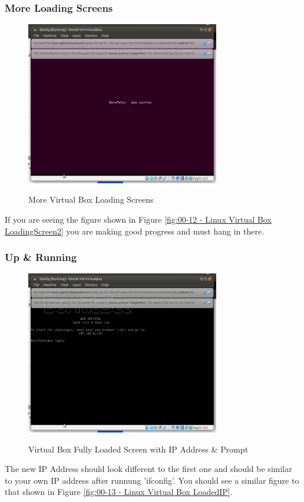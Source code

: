 \subsubsection{More Loading Screens}
\begin{figure}[!htb]
    \centering
    \includegraphics[width=0.752\textwidth]{images/00-12.png}\\[0cm]  
    \caption[Virtual Box]{More Virtual Box Loading Screens}
    \label{fig:00-12 - Linux Virtual Box LoadingScreen2} 
\end{figure}
If you are seeing the figure shown in Figure \vref{fig:00-12 - Linux Virtual Box LoadingScreen2}
you are making good progress and must hang in there.

\subsubsection{Up \& Running}

\begin{figure}[!htb]
    \centering
    \includegraphics[width=0.752\textwidth]{images/00-13.png}\\[0cm]  
    \caption[Virtual Box]{Virtual Box Fully Loaded Screen with IP Address \& Prompt}
    \label{fig:00-13 - Linux Virtual Box LoadedIP} 

\end{figure}
The new IP Address should look different to the first one and should be similar to
your own IP address after runnung 'ifconfig'.
You should see a similar figure to that shown in Figure \vref{fig:00-13 - Linux Virtual Box LoadedIP}.

